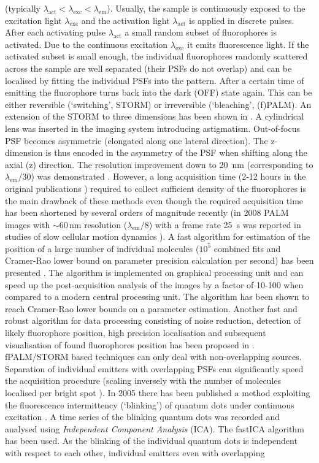 (typically $\lambda_{\mathrm{act}}<\lambda_{\mathrm{exc}}<\lambda_{\mathrm{em}}$). Usually, the sample is continuously exposed to the excitation light $\lambda_{\mathrm{exc}}$ and the activation light $\lambda_{\mathrm{act}}$ is applied in discrete pulses. After each activating pulse $\lambda_{\mathrm{act}}$ a small random subset of fluorophores is activated. Due to the continuous excitation $\lambda_{\mathrm{exc}}$ it emits fluorescence light. If the activated subset is small enough, the individual fluorophores randomly scattered across the sample are well separated (their PSFs do not overlap) and can be localised by fitting the individual PSFs into the pattern. After a certain time of emitting the fluorophore turns back into the dark (OFF) state again. This can be either reversible (`switching', STORM) or irreversible (`bleaching', (f)PALM). An extension of the STORM to three dimensions has been shown in \citep{Huang2008}. A cylindrical lens was inserted in the imaging system introducing astigmatism. Out-of-focus PSF becomes asymmetric (elongated along one lateral direction). The z-dimension is thus encoded in the asymmetry of the PSF when shifting along the axial (z) direction. The resolution improvement down to 20~nm (corresponding to $\lambda_{\mathrm{em}}/30$) was demonstrated \citep{Betzig2006,Rust2006_STORM}. However, a long acquisition time (2-12 hours in the original publications \citep{Betzig2006}) required to collect sufficient density of the fluorophores is the main drawback of these methods even though the required acquisition time has been shortened by several orders of magnitude recently (in 2008 PALM images with $\sim60\,\mathrm{nm}$ resolution ($\lambda_{\mathrm{em}}/8$) with a frame rate 25~s was reported in studies of slow cellular motion dynamics \citep{Shroff2008LiveFPALM}). A fast algorithm for estimation of the position of a large number of individual molecules ($10^{5}$ combined fits and Cramer-Rao lower bound on parameter precision calculation per second) has been presented \citep{Smith2010}. The algorithm is implemented on graphical processing unit and can speed up the post-acquisition analysis of the images by a factor of 10-100 when compared to a modern central processing unit. The algorithm has been shown to reach Cramer-Rao lower bounds on a parameter estimation. Another fast and robust algorithm for data processing consisting of noise reduction, detection of likely fluorophore position, high precision localisation and subsequent visualisation of found fluorophores position has been proposed in \citep{Wolter2010}. fPALM/STORM based techniques can only deal with non-overlapping sources. Separation of individual emitters with overlapping PSFs can significantly speed the acquisition procedure (scaling inversely with the number of molecules localised per bright spot \citep{Small2009}). In 2005 there has been published a method exploiting the fluorescence intermittency (`blinking') of quantum dots under continuous excitation \citep{Lidke2005}. A time series of the blinking quantum dots was recorded and analysed using \emph{Independent Component Analysis} (ICA). The fastICA algorithm \citep{Hyvarinen2000} has been used. As the blinking of the individual quantum dots is independent with respect to each other, individual emitters even with overlapping 